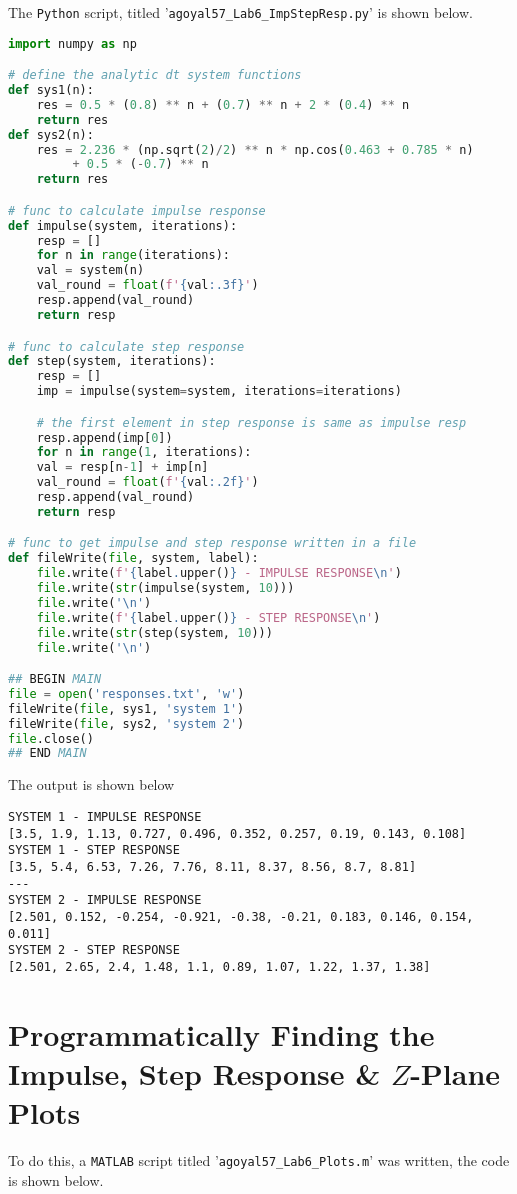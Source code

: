 \documentclass[]{report}
\newcommand{\matlab}{\texttt{MATLAB} }
\newcommand{\python}{\texttt{Python} }
\begin{document}
The \python script, titled '\texttt{agoyal57\_Lab6\_ImpStepResp.py}' is shown below.
\begin{lstlisting}[language=Python, frame=single]
import numpy as np

# define the analytic dt system functions
def sys1(n):
	res = 0.5 * (0.8) ** n + (0.7) ** n + 2 * (0.4) ** n
	return res
def sys2(n):
	res = 2.236 * (np.sqrt(2)/2) ** n * np.cos(0.463 + 0.785 * n)
   		 + 0.5 * (-0.7) ** n
	return res

# func to calculate impulse response
def impulse(system, iterations):
	resp = []
	for n in range(iterations):
	val = system(n)
	val_round = float(f'{val:.3f}')
	resp.append(val_round)
	return resp

# func to calculate step response
def step(system, iterations):
	resp = []
	imp = impulse(system=system, iterations=iterations)

	# the first element in step response is same as impulse resp
	resp.append(imp[0])
	for n in range(1, iterations):
	val = resp[n-1] + imp[n]
	val_round = float(f'{val:.2f}')
	resp.append(val_round)
	return resp

# func to get impulse and step response written in a file
def fileWrite(file, system, label):
	file.write(f'{label.upper()} - IMPULSE RESPONSE\n')
	file.write(str(impulse(system, 10)))
	file.write('\n')
	file.write(f'{label.upper()} - STEP RESPONSE\n')
	file.write(str(step(system, 10)))
	file.write('\n')

## BEGIN MAIN
file = open('responses.txt', 'w')
fileWrite(file, sys1, 'system 1')
fileWrite(file, sys2, 'system 2')
file.close()
## END MAIN
\end{lstlisting}

The output is shown below
\begin{lstlisting}[frame=single]
SYSTEM 1 - IMPULSE RESPONSE
[3.5, 1.9, 1.13, 0.727, 0.496, 0.352, 0.257, 0.19, 0.143, 0.108]
SYSTEM 1 - STEP RESPONSE
[3.5, 5.4, 6.53, 7.26, 7.76, 8.11, 8.37, 8.56, 8.7, 8.81]
---
SYSTEM 2 - IMPULSE RESPONSE
[2.501, 0.152, -0.254, -0.921, -0.38, -0.21, 0.183, 0.146, 0.154, 0.011]
SYSTEM 2 - STEP RESPONSE
[2.501, 2.65, 2.4, 1.48, 1.1, 0.89, 1.07, 1.22, 1.37, 1.38]
\end{lstlisting}


\section*{Programmatically Finding the Impulse, Step Response \& $Z$-Plane Plots}
To do this, a \matlab script titled '\texttt{agoyal57\_Lab6\_Plots.m}' was written, the code is shown below.
\end{document}
